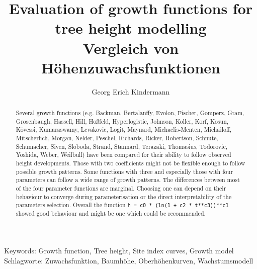 \documentclass[a4paper,twocolumn]{article}
\begin{document}
\title{Evaluation of growth functions for tree height modelling\\
Vergleich von H\"ohenzuwachsfunktionen}

\author{Georg Erich Kindermann}




\maketitle

Keywords: Growth function, Tree height, Site index curves, Growth model\\
Schlagworte: Zuwachsfunktion, Baumh\"ohe, Oberh\"ohenkurven, Wachstumsmodell

\begin{abstract}
  Several growth functions (e.g. Backman, Bertalanffy,
  Evolon, Fischer, Gomperz, Gram, Grosenbaugh, Hassell, Hill,
  Ho{\ss}feld, Hyperlogistic, Johnson, Koller, Korf, Kosun, K\"ovessi,
  Kumaraswamy, Levakovic, Logit, Maynard, Michaelis-Menten, Michailoff,
  Mitscherlich, Morgan, Nelder, Peschel, Richards, Ricker, Robertson,
  Schnute, Schumacher, Siven, Sloboda, Strand, Stannard, Terazaki,
  Thomasius, Todorovic, Yoshida, Weber, Weilbull) have been compared
  for their ability to follow observed height developments. Those with
  two coefficients might not be flexible enough to follow possible
  growth patterns. Some functions with three and especially those with
  four parameters can follow a wide range of growth patterns. The
  differences between most of the four parameter functions are
  marginal. Choosing one can depend on their behaviour to converge
  during parameterisation or the direct interpretability of the
  parameters selection. Overall the function \texttt{h = c0 * (ln(1 +
    c2 * t**c3))**c1}
  showed good behaviour and might be one which could be recommended.\\
\vskip1pt
\end{abstract}
\end{document}
